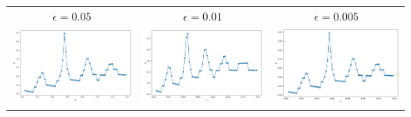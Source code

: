 \documentclass[a4paper,preprint,11pt]{article}
\begin{document}
\begin{table}[ht]
    \begin{tabular}{ccc}
	$\epsilon=0.05$ & $\epsilon=0.01$ & $\epsilon=0.005$  \\
    \includegraphics[scale=0.2]{m02e005.png} & \includegraphics[scale=0.2]{m02e001.png} & \includegraphics[scale=0.2]{m02e0005.png}  \\

\end{tabular}
\end{table}
\end{document}
